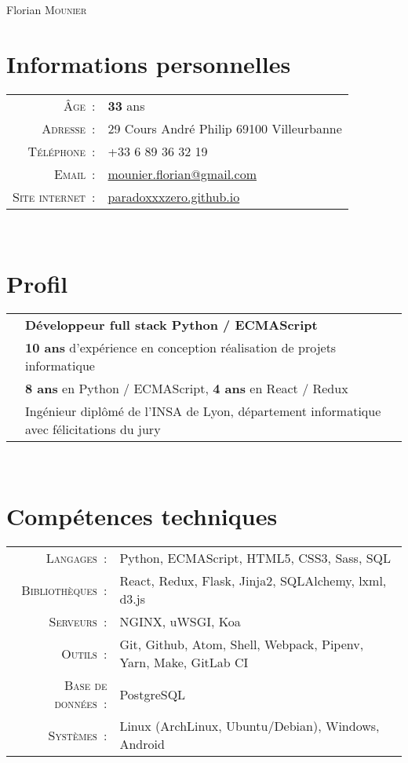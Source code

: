 \documentclass[a4paper,10pt]{article}
\begin{document}
  \pagestyle{empty}
  \par{\centering
    {\Huge Florian \textsc{Mounier}
    }\bigskip\par}

  \section{Informations personnelles}
  \begin{tabular}{rl}
    \textsc{Âge :}
      & \textbf{33} ans \\
    \textsc{Adresse :}
      & 29 Cours André Philip 69100 Villeurbanne \\
    \textsc{Téléphone :}
      & +33 6 89 36 32 19 \\
    \textsc{Email :}
      & \href{mailto:mounier.florian@gmail.com}{mounier.florian@gmail.com} \\
    \textsc{Site internet :}
      & \href{http://paradoxxxzero.github.com}{paradoxxxzero.github.io} \\
  \end{tabular} \\

  \section{Profil}
  \begin{tabular}{rl}
    & \textbf {Développeur full stack Python / ECMAScript} \\
    & \textbf{10 ans} d’expérience en conception réalisation de projets informatique \\
    & \textbf{8 ans} en Python / ECMAScript, \textbf{4 ans} en React / Redux \\
    & Ingénieur diplômé de l’INSA de Lyon,
    département informatique avec félicitations du jury \\
  \end{tabular} \\

  \section{Compétences techniques}
  \begin{tabular}{rl}
    \textsc{Langages :}
      & Python, ECMAScript, HTML5, CSS3, Sass, SQL \\
    \textsc{Bibliothèques :}
      & React, Redux, Flask, Jinja2, SQLAlchemy, lxml, d3.js \\
    \textsc{Serveurs :}
      & NGINX, uWSGI, Koa \\
    \textsc{Outils :}
      & Git, Github, Atom, Shell, Webpack, Pipenv, Yarn, Make, GitLab CI \\
    \textsc{Base de données :}
      & PostgreSQL \\
    \textsc{Systèmes :}
      & Linux (ArchLinux, Ubuntu/Debian), Windows, Android \\
  \end{tabular} \\
\end{document}
